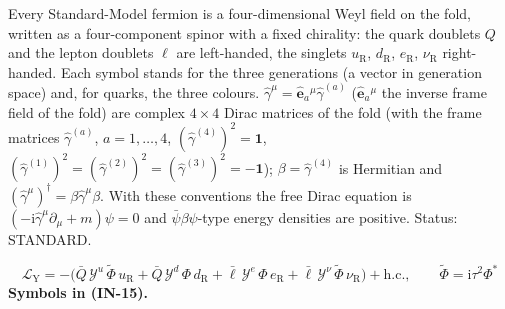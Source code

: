 \documentclass[
  10pt,
]{article}
\begin{document}
Every Standard-Model fermion is a four-dimensional Weyl field on the
fold, written as a four-component spinor with a fixed chirality: the
quark doublets \(Q\) and the lepton doublets \(\ell\) are left-handed,
the singlets \(u_{\mathrm{R}}\), \(d_{\mathrm{R}}\), \(e_{\mathrm{R}}\),
\(\nu_{\mathrm{R}}\) right-handed. Each symbol stands for the three
generations (a vector in generation space) and, for quarks, the three
colours. \(\hat\gamma^\mu = \hat{\mathbf{e}}_a{}^\mu\hat\gamma^{(a)}\)
(\(\hat{\mathbf{e}}_a{}^\mu\) the inverse frame field of the fold) are
complex \(4 \times 4\) Dirac matrices of the fold (with the frame
matrices \(\hat\gamma^{(a)}\), \(a = 1, \dots, 4\),
\((\hat\gamma^{(4)})^2 = \mathbf{1}\),
\((\hat\gamma^{(1)})^2 = (\hat\gamma^{(2)})^2 = (\hat\gamma^{(3)})^2 = -\mathbf{1}\));
\(\beta = \hat\gamma^{(4)}\) is Hermitian and
\((\hat\gamma^\mu)^\dagger = \beta\hat\gamma^\mu\beta\). With these
conventions the free Dirac equation is
\((-\mathrm{i}\hat\gamma^\mu\partial_\mu + m)\psi = 0\) and
\(\bar\psi\beta\psi\)-type energy densities are positive. Status:
STANDARD.

\[
\mathcal{L}_{\mathrm{Y}} = -\big(\bar Q\,\mathcal{Y}^{u}\,\tilde\Phi\,u_{\mathrm{R}} + \bar Q\,\mathcal{Y}^{d}\,\Phi\,d_{\mathrm{R}}
 + \bar\ell\,\mathcal{Y}^{e}\,\Phi\,e_{\mathrm{R}} + \bar\ell\,\mathcal{Y}^{\nu}\,\tilde\Phi\,\nu_{\mathrm{R}}\big)
 + \mathrm{h.c.},\qquad \tilde\Phi = \mathrm{i}\tau^2\Phi^* \tag{IN-15}
\] \textbf{Symbols in (IN-15).}
\end{document}
